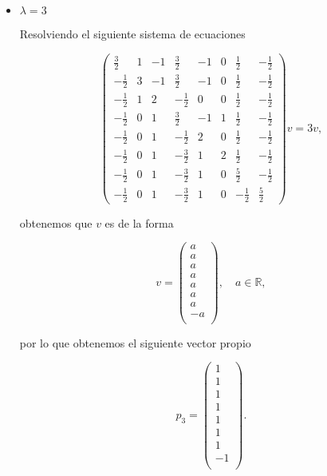 \documentclass[letterpaper]{article}
\theoremstyle{definition}
\theoremstyle{lemathm}
\theoremstyle{lemademthm}
\newcommand{\pars}[1]{\left( #1 \right) }
\newcommand{\RR}{\mathbb{R}}
\newcommand{\1}{\mathbbm{1}}
\begin{document}
\begin{enumerate}
\begin{itemize}
			\item $\lambda = 3$
			
			Resolviendo el siguiente sistema de ecuaciones
			
			\[\pars{\begin{array}{cccccccc} \frac{3}{2} & 1 & -1 & \frac{3}{2} & -1 & 0 & \frac{1}{2} & -\frac{1}{2} \\[1ex] -\frac{1}{2} & 3 & -1 & \frac{3}{2} & -1 & 0 & \frac{1}{2} & -\frac{1}{2} \\[1ex] -\frac{1}{2} & 1 & 2 & -\frac{1}{2} & 0 & 0 & \frac{1}{2} & -\frac{1}{2} \\[1ex] -\frac{1}{2} & 0 & 1 & \frac{3}{2} & -1 & 1 & \frac{1}{2} & -\frac{1}{2} \\[1ex] -\frac{1}{2} & 0 & 1 & -\frac{1}{2} & 2 & 0 & \frac{1}{2} & -\frac{1}{2} \\[1ex] -\frac{1}{2} & 0 & 1 & -\frac{3}{2} & 1 & 2 & \frac{1}{2} & -\frac{1}{2} \\[1ex] -\frac{1}{2} & 0 & 1 & -\frac{3}{2} & 1 & 0 & \frac{5}{2} & -\frac{1}{2} \\[1ex] -\frac{1}{2} & 0 & 1 & -\frac{3}{2} & 1 & 0 & -\frac{1}{2} & \frac{5}{2} \end{array}} v = 3 v,\]

			obtenemos que $v$ es de la forma

			\[v = \pars{\begin{array}{c}
				a\\[1ex]
				a\\[1ex]
				a\\[1ex]
				a\\[1ex]
				a\\[1ex]
				a\\[1ex]
				a\\[1ex]
				-a\\
			\end{array}}, \quad a\in\RR,\]

			por lo que obtenemos el siguiente vector propio

			\[p_3 = \pars{\begin{array}{c}
				1\\[1ex]
				1\\[1ex]
				1\\[1ex]
				1\\[1ex]
				1\\[1ex]
				1\\[1ex]
				1\\[1ex]
				-1\\
			\end{array}}.\]


\end{itemize}
\end{enumerate}
\end{document}
